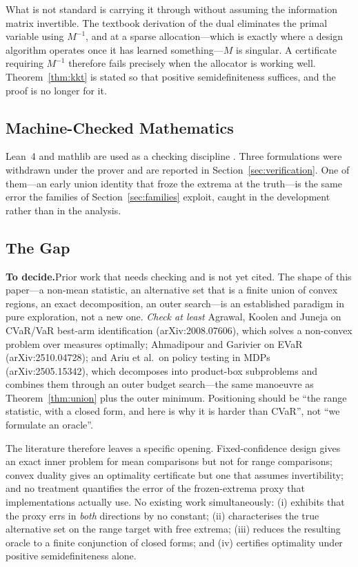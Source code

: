\documentclass[conference]{IEEEtran}
\theoremstyle{definition}
\newif\ifshownotes\shownotestrue
\newcommand{\TODOPAR}[1]{\ifshownotes\par\vspace{2pt}\noindent%
  {\color{todocol}\textsf{\footnotesize\textbf{To decide.}\;#1}}\par\vspace{2pt}\fi}
\begin{document}
What is not standard is carrying it through without assuming the information matrix
invertible. The textbook derivation of the dual eliminates the primal variable using
$M^{-1}$, and at a sparse allocation---which is exactly where a design algorithm operates
once it has learned something---$M$ is singular. A certificate requiring $M^{-1}$ therefore
fails precisely when the allocator is working well. Theorem~\ref{thm:kkt} is stated so that
positive semidefiniteness suffices, and the proof is no longer for it.

\subsection{Machine-Checked Mathematics}

Lean~4 and mathlib are used as a checking discipline \cite{demoura2021,mathlib2020}. Three
formulations were withdrawn under the prover and are reported in
Section~\ref{sec:verification}. One of them---an early union identity that froze the extrema
at the truth---is the same error the families of Section~\ref{sec:families} exploit, caught
in the development rather than in the analysis.

\subsection{The Gap}
\TODOPAR{Prior work that needs checking and is not yet cited. The shape of this
paper---a non-mean statistic, an alternative set that is a finite union of convex regions,
an exact decomposition, an outer search---is an established paradigm in pure exploration, not
a new one. \emph{Check at least} Agrawal, Koolen and Juneja on CVaR/VaR best-arm
identification (arXiv:2008.07606), which solves a non-convex problem over measures optimally;
Ahmadipour and Garivier on EVaR (arXiv:2510.04728); and Ariu et al.\ on policy testing in
MDPs (arXiv:2505.15342), which decomposes into product-box subproblems and combines them
through an outer budget search---the same manoeuvre as Theorem~\ref{thm:union} plus the
outer minimum. Positioning should be ``the range statistic, with a closed form, and here is
why it is harder than CVaR'', not ``we formulate an oracle''.}

The literature therefore leaves a specific opening. Fixed-confidence design gives an exact
inner problem for mean comparisons but not for range comparisons; convex duality gives an
optimality certificate but one that assumes invertibility; and no treatment quantifies the
error of the frozen-extrema proxy that implementations actually use. No existing work
simultaneously: (i) exhibits that the proxy errs in \emph{both} directions by no constant;
(ii) characterises the true alternative set on the range target with free extrema;
(iii) reduces the resulting oracle to a finite conjunction of closed forms; and
(iv) certifies optimality under positive semidefiniteness alone.
\end{document}
